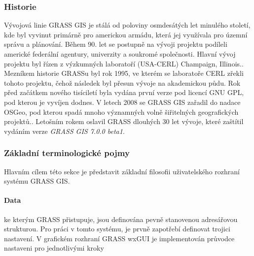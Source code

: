 \documentclass[a4paper,12pt]{report}
\begin{document}
\subsubsection*{Historie}
Vývojová linie GRASS GIS je stálá od poloviny osmdesátých let minulého století, kde byl vyvinut primárně pro americkou armádu, která jej využívala pro územní správu a plánování. Během 90. let se postupně na vývoji projektu podíleli americké federální agentury, univerzity a soukromé společnosti. Hlavní vývoj projektu byl řízen z výzkumných laboratoří (USA-CERL) Champaign, Illinois.\cite{grasshist}.
Mezníkem historie GRASSu byl rok 1995, ve kterém se laboratoře CERL zřekli tohoto projektu, čehož  následek byl přesun vývoje na akademickou půdu. Rok před začátkem nového tisíciletí byla vydána první verze pod licencí GNU GPL, pod kterou je vyvíjen dodnes. V letech 2008 se GRASS GIS zařadil do nadace \acs{OSGeo}, pod kterou spadá mnoho významných volně šiřitelných geografických projektů.. Letošním rokem oslavil GRASS dlouhých 30 let vývoje, které zaštítil vydáním verze \textit{GRASS GIS 7.0.0 beta1}.

\subsubsection*{Základní terminologické pojmy}
\label{subsubsec:grassterminologie}
Hlavním cílem této sekce je představit základní filosofii uživatelského rozhraní systému GRASS GIS.
\paragraph*{Data} ke kterým GRASS přistupuje, jsou definována  pevně stanovenou  adresářovou  strukturou. Pro práci v tomto systému, je prvně zapotřebí definovat trojici nastavení. V grafickém rozhraní GRASS \acs{wxGUI} je implementován průvodce nastaveni pro jednotlivými kroky 
\end{document}
